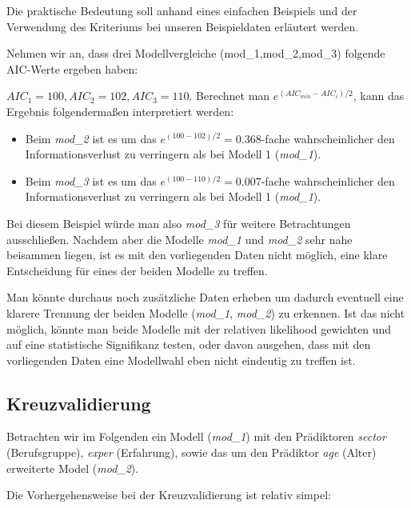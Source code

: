 \documentclass[]{article}
\providecommand{\tightlist}{%
  \setlength{\itemsep}{0pt}\setlength{\parskip}{0pt}}
\begin{document}
Die praktische Bedeutung soll anhand eines einfachen Beispiels und der Verwendung des Kriteriums bei unseren Beispieldaten erläutert werden.

Nehmen wir an, dass drei Modellvergleiche (mod\_1,mod\_2,mod\_3) folgende AIC-Werte ergeben haben:

\(AIC_1 = 100, AIC_2 = 102, AIC_3 = 110\). Berechnet man \(e^{(AIC_{min} - AIC_i)/2}\), kann das Ergebnis folgendermaßen interpretiert werden:

\begin{itemize}
\tightlist
\item
  Beim \emph{mod\_2} ist es um das \(e^{(100-102)/2} = 0.368\)-fache wahrscheinlicher den Informationsverlust zu verringern als bei Modell 1 (\emph{mod\_1}).
\item
  Beim \emph{mod\_3} ist es um das \(e^{(100-110)/2} = 0.007\)-fache wahrscheinlicher den Informationsverlust zu verringern als bei Modell 1 (\emph{mod\_1}).
\end{itemize}

Bei diesem Beispiel würde man also \emph{mod\_3} für weitere Betrachtungen ausschließen. Nachdem aber die Modelle \emph{mod\_1} und \emph{mod\_2} sehr nahe beisammen liegen, ist es mit den vorliegenden Daten nicht möglich, eine klare Entscheidung für eines der beiden Modelle zu treffen.

Man könnte durchaus noch zusätzliche Daten erheben um dadurch eventuell eine klarere Trennung der beiden Modelle (\emph{mod\_1}, \emph{mod\_2}) zu erkennen. Ist das nicht möglich, könnte man beide Modelle mit der relativen likelihood gewichten und auf eine statistische Signifikanz testen, oder davon ausgehen, dass mit den vorliegenden Daten eine Modellwahl eben nicht eindeutig zu treffen ist.

\hypertarget{kreuzvalidierung}{%
\subsection*{Kreuzvalidierung}\label{kreuzvalidierung}}

Betrachten wir im Folgenden ein Modell (\emph{mod\_1}) mit den Prädiktoren \emph{sector} (Berufsgruppe), \emph{exper} (Erfahrung), sowie das um den Prädiktor \emph{age} (Alter) erweiterte Model (\emph{mod\_2}).

Die Vorhergehensweise bei der Kreuzvalidierung ist relativ simpel:
\end{document}
